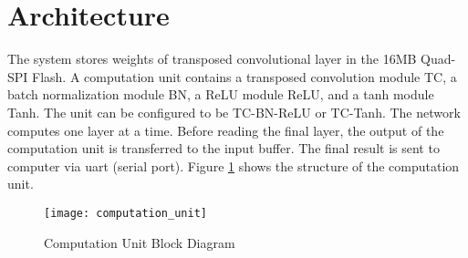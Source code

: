 \section{Architecture}

The system stores weights of transposed convolutional layer in the 16MB Quad-SPI Flash. A computation unit
contains a transposed convolution module TC, a batch normalization module BN, a ReLU module ReLU,
and a tanh module Tanh. The unit can be configured to be TC-BN-ReLU or TC-Tanh. The network computes one
layer at a time. Before reading the final layer, the output of the computation unit is transferred to the
input buffer. The final result is sent to computer via \gls{uart} (serial port). Figure
\ref{fig:computation_unit} shows the structure of the computation unit.

\begin{figure}[h]
  \centering
  \texttt{[image: computation\_unit]}
  \caption{Computation Unit Block Diagram}
  \label{fig:computation_unit}
\end{figure}

\clearpage %
